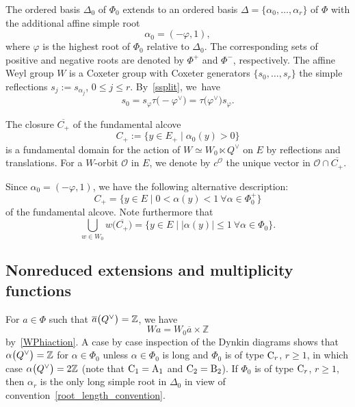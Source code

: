 \documentclass[pdftex]{sigma}
\numberwithin{equation}{section}
\begin{document}
The ordered basis $\Delta_0$ of $\Phi_0$ extends to an ordered basis
$\Delta=\{\alpha_0,\dots,\alpha_r\}$ of $\Phi$ with the additional affine simple root
\[
\alpha_0=(-\varphi,1),
\]
where $\varphi$ is the highest root of $\Phi_0$ relative to $\Delta_0$. The corresponding sets of positive and negative roots are denoted by $\Phi^+$ and $\Phi^-$, respectively.
The affine Weyl group $W$ is a Coxeter group with Coxeter generators $\{s_0,\dots,s_r\}$ the simple reflections $s_j:=s_{\alpha_j}$, $0\leq j\leq r$. By~\eqref{ssplit}, we~have
\[
s_0=s_\varphi\tau\bigl(-\varphi^\vee\bigr)=\tau\bigl(\varphi^\vee\bigr)s_\varphi.
\]

The closure $\overline{C_+}$ of the fundamental alcove
\begin{equation*}%
C_+:=\{y\in E_+ \mid \alpha_0(y)>0\}
\end{equation*}
is a fundamental domain for the action of $W\simeq W_0\ltimes Q^\vee$ on $E$ by reflections and translations.
For a $W$-orbit $\mathcal{O}$ in $E$, we denote by
$c^\mathcal{O}$ the unique vector in $\mathcal{O}\cap \overline{C_+}$.

Since $\alpha_0=(-\varphi,1)$, we have the following alternative description:
\[
C_+=\bigl\{y\in E \mid 0<\alpha(y)<1 \ \forall \alpha\in\Phi_0^+\bigr\}
\]
of the fundamental alcove.
Note furthermore that
\begin{equation}\label{W0C}
\bigcup_{w\in W_0}w\bigl(\overline{C_+}\bigr)=\{y\in E \mid |\alpha(y)|\leq 1\ \forall \alpha\in\Phi_0\}.
\end{equation}

\subsection{Nonreduced extensions and multiplicity functions}

For $a\in\Phi$ such that $\overline{a}\smash{\bigl(Q^\vee\bigr)}=\mathbb{Z}$, we have
\[
Wa=W_0 \overline{a}\times\mathbb{Z}
\]
by~\eqref{WPhiaction}. A case by case inspection of the Dynkin diagrams shows that $\alpha\smash{\bigl(Q^\vee\bigr)}=\mathbb{Z}$ for $\alpha\in\Phi_0$ unless $\alpha\in\Phi_0$ is long and
 $\Phi_0$ is of type ${\rm C}_r$, $r\geq 1$, in which case $\alpha\smash{\bigl(Q^\vee\bigr)}=2\mathbb{Z}$ (note that ${\rm C}_1=\textup{A}_1$ and ${\rm C}_2=\textup{B}_2$).
If $\Phi_0$ is of type ${\rm C}_r$, $r\geq 1$, then $\alpha_r$ is the only long simple root in $\Delta_0$ in view of convention~\ref{root_length_convention}.
\end{document}
